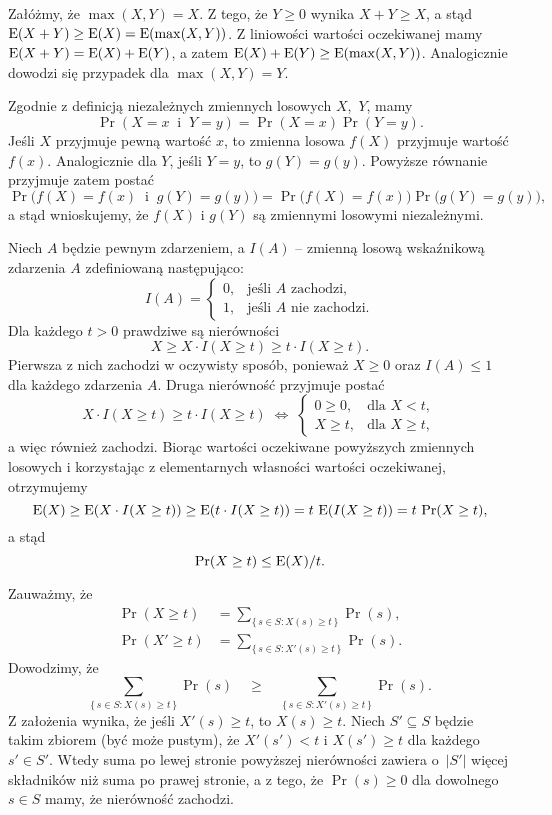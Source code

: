 \exercise{} %
\noindent Załóżmy, że $\max(X,Y)=X$. Z tego, że $Y\ge0$ wynika $X+Y\ge X$, a stąd $\operatorname{E}(X+Y)\ge\operatorname{E}(X)=\operatorname{E}(\max(X,Y))$. Z liniowości wartości oczekiwanej mamy $\operatorname{E}(X+Y)=\operatorname{E}(X)+\operatorname{E}(Y)$, a zatem $\operatorname{E}(X)+\operatorname{E}(Y)\ge\operatorname{E}(\max(X,Y))$. Analogicznie dowodzi się przypadek dla $\max(X,Y)=Y$.

\exercise{} %
\noindent Zgodnie z definicją niezależnych zmiennych losowych $X$,~$Y$, mamy
\[
	\Pr(X=x\;\;\text{i}\;\;Y=y) = \Pr(X=x)\Pr(Y=y).
\]
Jeśli $X$ przyjmuje pewną wartość $x$, to zmienna losowa $f(X)$ przyjmuje wartość $f(x)$. Analogicznie dla $Y$, jeśli $Y=y$, to $g(Y)=g(y)$. Powyższe równanie przyjmuje zatem postać
\[
	\Pr\bigl(f(X)=f(x)\;\;\text{i}\;\;g(Y)=g(y)\bigr) = \Pr\bigl(f(X)=f(x)\bigr)\Pr\bigl(g(Y)=g(y)\bigr),
\]
a stąd wnioskujemy, że $f(X)$ i $g(Y)$ są zmiennymi losowymi niezależnymi.

\exercise{} %
\noindent Niech $A$ będzie pewnym zdarzeniem, a $I(A)$ -- zmienną losową wskaźnikową zdarzenia $A$ zdefiniowaną następująco:
\[
	I(A) =
	\begin{cases}
		0, & \text{jeśli $A$ zachodzi,} \\
		1, & \text{jeśli $A$ nie zachodzi.}
	\end{cases}
\]
Dla każdego $t>0$ prawdziwe są nierówności
\[
	X\ge X\cdot I(X\ge t)\ge t\cdot I(X\ge t).
\]
Pierwsza z nich zachodzi w oczywisty sposób, ponieważ $X\ge0$ oraz $I(A)\le1$ dla każdego zdarzenia $A$. Druga nierówność przyjmuje postać
\[
	X\cdot I(X\ge t)\ge t\cdot I(X\ge t)\;\Leftrightarrow\;
	\begin{cases}
		0\ge0, & \text{dla $X<t$}, \\
		X\ge t, & \text{dla $X\ge t$},
	\end{cases}
\]
a więc również zachodzi. Biorąc wartości oczekiwane powyższych zmiennych losowych i korzystając z elementarnych własności wartości oczekiwanej, otrzymujemy
\[
	\operatorname{E}(X) \ge \operatorname{E}(X\cdot I(X\ge t)) \ge \operatorname{E}(t\cdot I(X\ge t)) = t\,\operatorname{E}(I(X\ge t)) = t\,\Pr(X\ge t),
\]
a stąd
\[
	\Pr(X\ge t) \le \operatorname{E}(X)/t.
\]

\exercise{} %
\noindent Zauważmy, że
\begin{align*}
	\Pr(X\ge t) &= \sum_{\{\,s\in S:X(s)\ge t\,\}}\Pr(s), \\
	\Pr(X'\ge t) &= \sum_{\{\,s\in S:X'(s)\ge t\,\}}\Pr(s).
\end{align*}
Dowodzimy, że
\[
	\sum_{\{\,s\in S:X(s)\ge t\,\}}\Pr(s)\quad \ge \quad\sum_{\{\,s\in S:X'(s)\ge t\,\}}\Pr(s).
\]
Z założenia wynika, że jeśli $X'(s)\ge t$, to $X(s)\ge t$. Niech $S'\subseteq S$ będzie takim zbiorem (być może pustym), że $X'(s')<t$ i $X(s')\ge t$ dla każdego $s'\in S'$. Wtedy suma po lewej stronie powyższej nierówności zawiera o~$|S'|$ więcej składników niż suma po prawej stronie, a z tego, że $\Pr(s)\ge0$ dla dowolnego $s\in S$ mamy, że nierówność zachodzi.

